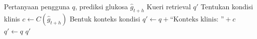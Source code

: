 \begin{algorithm}[!htbp]
    \caption{Query Transformation Terkondisi-Prediksi}
    \label{alg:alg5.3_query_transformation_terkondisi_prediksi}
    \begin{algorithmic}[1]
        \Require Pertanyaan pengguna $q$, prediksi glukosa $\hat{g}_{t+h}$
        \Ensure Kueri retrieval $q'$
        \State Tentukan kondisi klinis $c \gets C(\hat{g}_{t+h})$
            \State Bentuk konteks kondisi
            \State $q' \gets q + \text{``Konteks klinis: ''} + c$
        \Else
            \State $q' \gets q$
        \EndIf
        \State \Return $q'$
    \end{algorithmic}
\end{algorithm}
